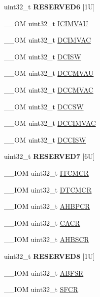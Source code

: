 \begin{DoxyCompactItemize}
\item 
\mbox{\label{struct_s_c_b___type_aecf1563d46d998532d9a9fdb0a9affff}} 
uint32\+\_\+t {\bfseries R\+E\+S\+E\+R\+V\+E\+D6} \mbox{[}1\+U\mbox{]}
\item 
\+\_\+\+\_\+\+OM uint32\+\_\+t \hyperlink{struct_s_c_b___type_a1a8ecda7b1e4a1100dd82fc694bb4eb5}{I\+C\+I\+M\+V\+AU}
\item 
\+\_\+\+\_\+\+OM uint32\+\_\+t \hyperlink{struct_s_c_b___type_a72402d657f9e448afce57bbd8577864d}{D\+C\+I\+M\+V\+AC}
\item 
\+\_\+\+\_\+\+OM uint32\+\_\+t \hyperlink{struct_s_c_b___type_aca1ec746911b0934dd11c31d93a369be}{D\+C\+I\+SW}
\item 
\+\_\+\+\_\+\+OM uint32\+\_\+t \hyperlink{struct_s_c_b___type_a9d4029e220311690756d836948e71393}{D\+C\+C\+M\+V\+AU}
\item 
\+\_\+\+\_\+\+OM uint32\+\_\+t \hyperlink{struct_s_c_b___type_acc23dc74d8f0378d81bc72302e325e50}{D\+C\+C\+M\+V\+AC}
\item 
\+\_\+\+\_\+\+OM uint32\+\_\+t \hyperlink{struct_s_c_b___type_a2bf149d6d8f4fa59e25aee340512cb79}{D\+C\+C\+SW}
\item 
\+\_\+\+\_\+\+OM uint32\+\_\+t \hyperlink{struct_s_c_b___type_a18ef4bf4fbbb205544985598b1bb64f4}{D\+C\+C\+I\+M\+V\+AC}
\item 
\+\_\+\+\_\+\+OM uint32\+\_\+t \hyperlink{struct_s_c_b___type_ab6e447723358e736a9f69ffc88a97ba1}{D\+C\+C\+I\+SW}
\item 
\mbox{\label{struct_s_c_b___type_a673086408889531c2e8220a306411a43}} 
uint32\+\_\+t {\bfseries R\+E\+S\+E\+R\+V\+E\+D7} \mbox{[}6\+U\mbox{]}
\item 
\+\_\+\+\_\+\+I\+OM uint32\+\_\+t \hyperlink{struct_s_c_b___type_a18d1734811b40e7edf6e5213bf336ca8}{I\+T\+C\+M\+CR}
\item 
\+\_\+\+\_\+\+I\+OM uint32\+\_\+t \hyperlink{struct_s_c_b___type_ad5a9c8098433fa3ac108487e0ccd9cfc}{D\+T\+C\+M\+CR}
\item 
\+\_\+\+\_\+\+I\+OM uint32\+\_\+t \hyperlink{struct_s_c_b___type_a209b4026c2994d0e18e883aa9af5c3cc}{A\+H\+B\+P\+CR}
\item 
\+\_\+\+\_\+\+I\+OM uint32\+\_\+t \hyperlink{struct_s_c_b___type_a39711bf09810b078ac81b2c76c6908f6}{C\+A\+CR}
\item 
\+\_\+\+\_\+\+I\+OM uint32\+\_\+t \hyperlink{struct_s_c_b___type_a25bb4ac449a4122217e2ca74b9ad4e3e}{A\+H\+B\+S\+CR}
\item 
\mbox{\label{struct_s_c_b___type_ac51834a471d74e0522dd2734079d57cb}} 
uint32\+\_\+t {\bfseries R\+E\+S\+E\+R\+V\+E\+D8} \mbox{[}1\+U\mbox{]}
\item 
\+\_\+\+\_\+\+I\+OM uint32\+\_\+t \hyperlink{struct_s_c_b___type_aa104b9e01b129abe3de43c439916f655}{A\+B\+F\+SR}
\item 
\+\_\+\+\_\+\+I\+OM uint32\+\_\+t \hyperlink{struct_s_c_b___type_aaddfff3b57de6faf60bfcc938c7229c9}{S\+F\+CR}
\end{DoxyCompactItemize}


